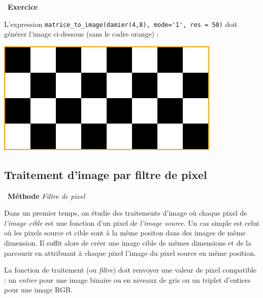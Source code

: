\documentclass[a4paper, french, 12pt]{article}
\newcounter{exo}
\newenvironment{exercice}[1]
{\par \medskip   \addtocounter{exo}{1} \noindent  
\begin{bclogo}[arrondi =0.1,   noborder = true, logo=\bccrayon, marge=4]{~\textbf{Exercice} \textbf{\theexo} {\itshape #1} }  \par}
{
\end{bclogo}
 \par \bigskip }
\newenvironment{methode}[1]
{\par \medskip    \noindent  
 \begin {bclogo}[arrondi =0.1,logo=\bcoutil, marge=4,noborder = true] {~\textbf{Méthode}   {\itshape #1} }  \par}
{
\end{bclogo}
 \par \bigskip }
\begin{document}
\begin{exercice}{}
\begin{enumerate}
L'expression \lstinline+matrice_to_image(damier(4,8), mode='1', res = 50)+ doit générer l'image ci-dessous (sans le cadre orange) :

\begin{center}
\includegraphics[scale=0.5]{images/damier-cadre.png}
\end{center}
\end{enumerate}

\end{exercice}

\vspace*{-15pt}


\subsection{Traitement d'image par filtre de pixel}

\vspace*{-15pt}

\begin{methode}{Filtre de pixel}
Dans un premier temps, on étudie des traitements d'image où chaque pixel de \textit{l'image cible} est une fonction d'un pixel de \textit{l'image source}. Un cas simple est celui où les pixels source et cible sont à la même positon dans des images de même dimension.  Il suffit alors de  créer une image cible de mêmes dimensions  et de la parcourir en attribuant à chaque pixel l'image du pixel source  en même position.

\bcattention{} La fonction de traitement (ou \textit{filtre}) doit renvoyer une valeur de pixel compatible : un \textit{entier} pour une image binaire ou en niveaux de gris ou un triplet d'entiers pour une image RGB.

\begin{center}
\end{center}
\end{methode}
\end{document}
